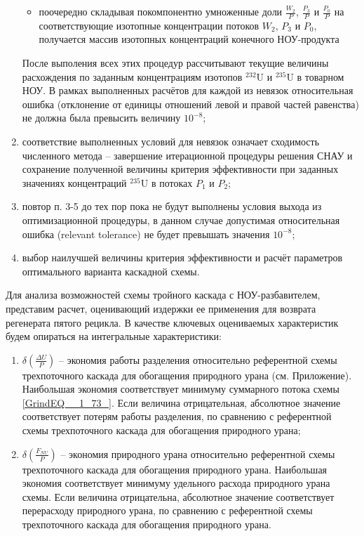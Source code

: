 \begin{enumerate}
\begin{itemize}
        \item поочередно складывая покомпонентно умноженные доли $\frac{W_{2}}{P}$, $\frac{P_{3}}{P}$ и $\frac{P_{0}}{P}$ на соответствующие изотопные концентрации потоков $W_2$, $P_3$ и $P_0$, получается массив изотопных концентраций конечного НОУ-продукта
        \end{itemize}
    После выполения всех этих процедур рассчитывают текущие величины расхождения по заданным концентрациям изотопов $^{232}$U и $^{235}$U в товарном НОУ. В рамках выполненных расчётов для каждой из невязок относительная ошибка (отклонение от единицы отношений левой и правой частей равенства) не должна была превысить величину $10^{-8}$;
    \item соответствие выполненных условий для невязок означает сходимость численного метода -- завершение итерационной процедуры решения СНАУ и сохранение полученной величины критерия эффективности при заданных значениях концентраций $^{235}$U в потоках $P_1$ и $P_2$;
    \item повтор п. 3-5 до тех пор пока не будут выполнены условия выхода из оптимизационной процедуры, в данном случае допустимая относительная ошибка (relevant tolerance) не будет превышать значения $10^{-8}$;
    \item выбор наилучшей величины критерия эффективности и расчёт параметров оптимального варианта каскадной схемы.
\end{enumerate}




Для анализа возможностей схемы тройного каскада с НОУ-разбавителем, представим расчет, оценивающий издержки ее применения для возврата регенерата пятого рецикла. 
В качестве ключевых оцениваемых характеристик будем опираться на интегральные характеристики:
\begin{enumerate}
    \item $\delta(\frac{\Delta U}{P})$ -- экономия работы разделения относительно референтной схемы трехпоточного каскада для обогащения природного урана (см. Приложение). Наибольшая экономия соответствует минимуму суммарного потока схемы \ref{GrindEQ__1_73_}. Если величина отрицательная, абсолютное значение соответствует потерям работы разделения, по сравнению с референтной схемы трехпоточного каскада для обогащения природного урана;
    \item $\delta(\frac{F_{NU}}{P})$ -- экономия природного урана относительно референтной схемы трехпоточного каскада для обогащения природного урана.  Наибольшая экономия соответствует минимуму удельного расхода природного урана схемы. Если величина отрицательна, абсолютное значение соответствует перерасходу природного урана, по сравнению с референтной схемы трехпоточного каскада для обогащения природного урана.
\end{enumerate}

